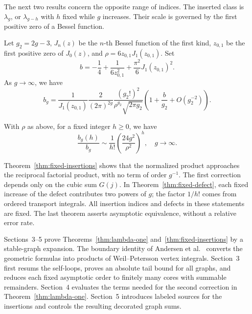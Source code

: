 The next two results concern the opposite range of indices.
The inserted class is $\lambda_g$, or $\lambda_{g-h}$ with $h$
fixed while $g$ increases. Their scale is governed by the first
positive zero of a Bessel function.

\begin{thm}
\label{thm:top-hodge}
Let $g_2=2g-3$, $J_n(z)$ be the $n$-th Bessel function of the first kind, $z_{0,1}$ be the first
positive zero of $J_0(z)$, and $\rho=6z_{0,1}J_1(z_{0,1})$.
Set
\[b=-\frac{1}{4}+\frac{1}{6z_{0,1}^2}+\frac{\pi^2}{6}J_1(z_{0,1})^2.\]
As $g\to\infty$, we have
\begin{equation}
b_g=\frac{1}{J_1(z_{0,1})}\frac{2}{(2\pi)^{2g}}\frac{(g_2!)^2}{\rho^{g_2}\sqrt{2\pi g_2}}\left(
1+\frac{b}{g_2}+O(g_2^{-2})\right).
\label{eq:g111}
\end{equation}
\end{thm}

\begin{thm}
\label{thm:fixed-defect}
With $\rho$ as above, for a fixed integer $h\geq0$, we have
\begin{equation}
\frac{b_g(h)}{b_g}\sim \frac{1}{h!}\left(\frac{24g^2}{\rho^2}\right)^h,\quad g\to\infty.
\label{eq:gh11}
\end{equation}
\end{thm}

Theorem~\ref{thm:fixed-insertions} shows that the normalized product
approaches the reciprocal factorial product, with no term of order
$g^{-1}$. The first correction depends only on the cubic sum
$G(j)$. In Theorem~\ref{thm:fixed-defect}, each fixed increase of
the defect contributes two powers of $g$; the factor $1/h!$
comes from ordered transport integrals. All insertion indices and
defects in these statements are fixed. The last theorem asserts
asymptotic equivalence, without a relative error rate.

Sections~3--5 prove Theorems~\ref{thm:lambda-one}
and~\ref{thm:fixed-insertions} by a stable-graph expansion.
The boundary identity of Andersen et al.\
\cite[Lemma 3.10]{ABCDGLW23} converts the geometric formulas into
products of Weil--Petersson vertex integrals. Section~3 first
resums the self-loops, proves an absolute tail bound for all graphs,
and reduces each fixed asymptotic order to finitely many cores
with summable remainders. Section~4 evaluates the terms needed
for the second correction in Theorem~\ref{thm:lambda-one}.
Section~5 introduces labeled sources for the insertions and
controls the resulting decorated graph sums.

